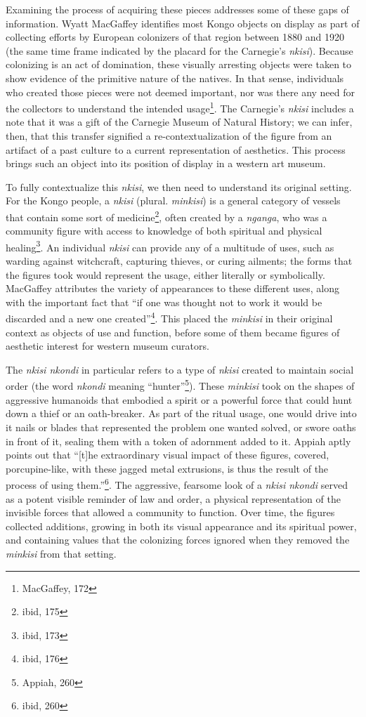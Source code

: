 Examining the process of acquiring these pieces addresses some of these gaps of
information. Wyatt MacGaffey identifies most Kongo objects on display as part of
collecting efforts by European colonizers of that region between 1880 and
1920 (the same time frame indicated by the placard for the Carnegie's
\textit{nkisi}). Because colonizing is an act of domination, these visually
arresting objects were taken to show evidence of the primitive nature of the
natives. In that sense, individuals who created those pieces were not deemed
important, nor was there any need for the collectors to understand the intended
usage\footnote{MacGaffey, 172}. The Carnegie's \textit{nkisi} includes a note
that it was a gift of the Carnegie Museum of Natural History; we can infer,
then, that this transfer signified a re-contextualization of the figure from an
artifact of a past culture to a current representation of aesthetics. This
process brings such an object into its position of display in a western
art museum.

To fully contextualize this \textit{nkisi}, we then need to understand its
original setting. For the Kongo people, a \textit{nkisi} (plural.
\textit{minkisi}) is a general category of vessels that contain some sort of
medicine\footnote{ibid, 175}, often created by a \textit{nganga}, who was a
community figure with access to knowledge of both spiritual and physical
healing\footnote{ibid, 173}. An individual \textit{nkisi} can provide any of a
multitude of uses, such as warding against witchcraft, capturing thieves, or
curing ailments; the forms that the figures took would represent the usage,
either literally or symbolically. MacGaffey attributes the variety of
appearances to these different uses, along with the important fact that ``if one
was thought not to work it would be discarded and a new one
created''\footnote{ibid, 176}. This placed the \textit{minkisi} in their
original context as objects of use and function, before some of them became
figures of aesthetic interest for western museum curators.

The \textit{nkisi nkondi} in particular refers to a type of \textit{nkisi}
created to maintain social order (the word \textit{nkondi} meaning
``hunter''\footnote{Appiah, 260}). These \textit{minkisi} took on the shapes of
aggressive humanoids that embodied a spirit or a powerful force that could hunt
down a thief or an oath-breaker. As part of the ritual usage, one would drive
into it nails or blades that represented the problem one wanted solved, or swore
oaths in front of it, sealing them with a token of adornment added to it. Appiah
aptly points out that ``[t]he extraordinary visual impact of these figures,
covered, porcupine-like, with these jagged metal extrusions, is thus the result
of the process of using them.''\footnote{ibid, 260}. The aggressive, fearsome
look of a \textit{nkisi nkondi} served as a potent visible reminder of law and
order, a physical representation of the invisible forces that allowed a community
to function. Over time, the figures collected additions, growing in both its
visual appearance and its spiritual power, and containing values that the
colonizing forces ignored when they removed the \textit{minkisi} from that
setting.

